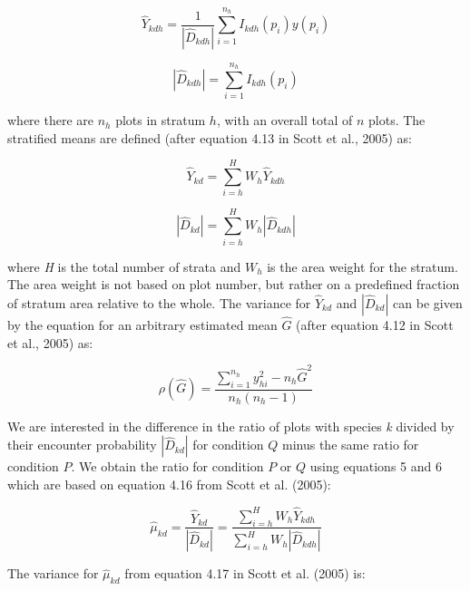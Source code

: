 \documentclass[12pt]{article}
\begin{document}
\begin{equation}
\hat{Y}_{kdh} = \frac{1}{|\hat{D}_{kdh}|}\displaystyle\sum_{i=1}^{n_h} I_{kdh}(p_i)y(p_i)  
\end{equation} 

\begin{equation}
|\hat{D}_{kdh}| = \displaystyle\sum_{i=1}^{n_h} I_{kdh}(p_i)
\end{equation} 

where there are $n_h$ plots in stratum $h$, with an overall total of $n$ plots.  The stratified means are defined (after equation 4.13 in Scott et al., 2005) as: 

 \begin{equation} \label{eq:hatY}
\hat{Y}_{kd} = \displaystyle\sum_{i=h}^{H} W_h \hat{Y}_{kdh}
\end{equation} 

\begin{equation}  \label{eq:hatD}
|\hat{D}_{kd}| = \displaystyle\sum_{i=h}^{H} W_h |\hat{D}_{kdh}|
\end{equation} 

where \emph{H} is the total number of strata and $W_h$ is the area weight for the stratum. The area weight is not based on plot number, but rather on a predefined fraction of stratum area relative to the whole.  The variance for $\hat{Y}_{kd}$ and $|\hat{D}_{kd}|$ can be given by the equation for an arbitrary estimated mean $\hat{G}$ (after equation 4.12 in Scott et al., 2005) as:

\begin{equation}
\rho(\hat{G}) = \frac{\displaystyle\sum_{i=1}^{n_h}y^2_{hi} - n_h\hat{G}^2}{n_h(n_h - 1)}
\end{equation}



We are interested in the difference in the ratio of plots with species \emph{k} divided by their encounter probability $|\hat{D}_{kd}|$ for condition $Q$ minus the same ratio for condition $P$.  We obtain the ratio for condition $P$ or $Q$ using equations 5 and 6 which are based on equation 4.16 from Scott et al. (2005):


 \begin{equation}  \label{eq:hatMu}
\hat{\mu}_{kd} = \frac{\hat{Y}_{kd}}{|\hat{D}_{kd}|} = \frac{\displaystyle\sum_{i=h}^{H} W_h \hat{Y}_{kdh}}{ \displaystyle\sum_{i=h}^{H} W_h |\hat{D}_{kdh}|}
\end{equation}
 
The variance for $\hat{\mu}_{kd}$ from equation 4.17 in Scott et al. (2005) is:
\end{document}
